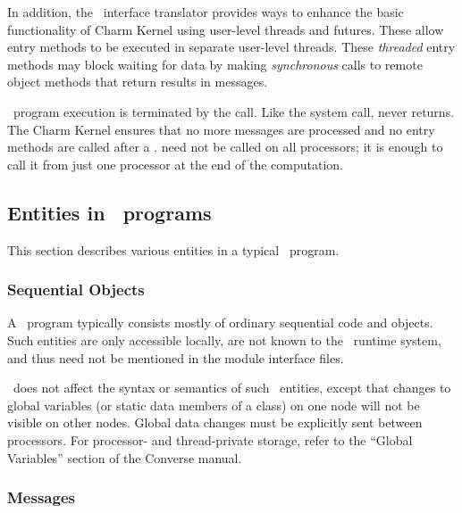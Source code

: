 In addition, the \charmpp\ interface translator provides ways to enhance the
basic functionality of Charm Kernel using user-level threads and futures. These
allow entry methods to be executed in separate user-level threads.  These
 {\em threaded} entry methods may block waiting for data by
making {\em synchronous} calls to remote object methods that return results in
messages.

\charmpp\ program execution is terminated by the  call.  Like the
 system call,  never returns. The Charm Kernel ensures
that no more messages are processed and no entry methods are called after a
.  need not be called on all processors; it is enough
to call it from just one processor at the end of the computation.


\subsection{Entities in \charmpp\ programs}

This section describes various entities in a typical \charmpp\ program.

\subsubsection{Sequential Objects}

A \charmpp\ program typically consists mostly of ordinary sequential \CC
code and objects. Such entities are only accessible locally, are not known
to the \charmpp\ runtime system, and thus need not be mentioned in the
module interface files. 

\charmpp\ does not affect the syntax or semantics of such \CC\ entities,
except that changes to global variables (or static data members of a class)
on one node will not be visible on other nodes.  Global data changes
must be explicitly sent between processors.  For processor- and
thread-private storage, refer to the ``Global Variables'' section
of the Converse manual.


\subsubsection{Messages}

